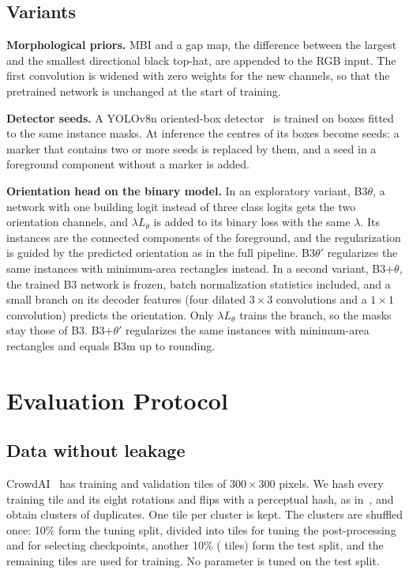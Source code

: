 \documentclass[conference]{IEEEtran}
\begin{document}
\subsection{Variants}
\textbf{Morphological priors.} MBI and a gap map, the difference between the largest and the smallest directional black
top-hat, are appended to the RGB input. The first convolution is widened with zero weights for the new channels, so
that the pretrained network is unchanged at the start of training.

\textbf{Detector seeds.} A YOLOv8n oriented-box detector~\cite{jocher2023yolov8} is trained on boxes fitted to the same
instance masks. At inference the centres of its boxes become seeds: a marker that contains two or more seeds is replaced
by them, and a seed in a foreground component without a marker is added.

\textbf{Orientation head on the binary model.} In an exploratory variant, B3$\theta$, a network with one building logit
instead of three class logits gets the two orientation channels, and $\lambda L_\theta$ is added to its binary loss with
the same $\lambda$. Its instances are the connected components of the foreground, and the regularization is guided by
the predicted orientation as in the full pipeline. B3$\theta'$ regularizes the same instances with minimum-area
rectangles instead. In a second variant, B3+$\theta$, the trained B3 network is frozen, batch normalization statistics
included, and a small branch on its decoder features (four dilated $3\times3$ convolutions and a $1\times1$ convolution)
predicts the orientation. Only $\lambda L_\theta$ trains the branch, so the masks stay those of B3. B3+$\theta'$
regularizes the same instances with minimum-area rectangles and equals B3m up to rounding.

\section{Evaluation Protocol}
\label{sec:protocol}
\subsection{Data without leakage}
CrowdAI~\cite{mohanty2020crowdai} has \NTrainImages{} training and \NValImages{} validation tiles of $300\times300$
pixels. We hash every training tile and its eight rotations and flips with a perceptual hash, as
in~\cite{adimoolam2023leakage}, and obtain \NTrainClusters{} clusters of duplicates. One tile per cluster is kept. The
clusters are shuffled once: 10\% form the tuning split, divided into \NTuneTiles{} tiles for tuning the post-processing
and \NSelectTiles{} for selecting checkpoints, another 10\% (\NTestTiles{} tiles) form the test split, and the remaining
\NTrainDedup{} tiles are used for training. No parameter is tuned on the test split.
\end{document}
